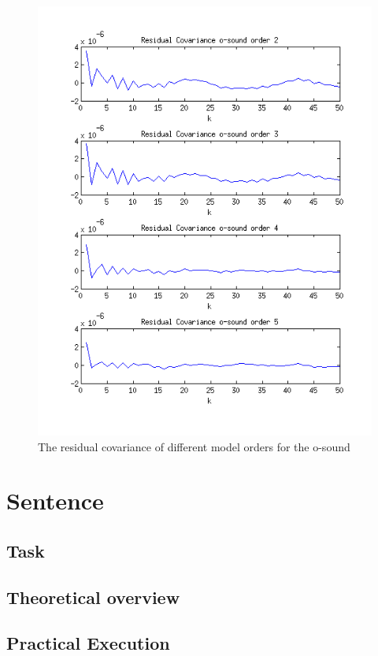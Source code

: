 \documentclass[12pt]{article}
\begin{document}
\begin{figure}[H]
\centering
\includegraphics[width=14cm]{residual_covariance_o.png}
\caption{The residual covariance of different model orders for the o-sound}
\end{figure}

\section{Sentence}

\subsection{Task}

\subsection{Theoretical overview}

\subsection{Practical Execution}
\end{document}
